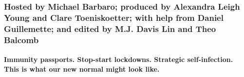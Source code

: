 \hypertarget{hosted-by-michael-barbaro-produced-by-alexandra-leigh-young-and-clare-toeniskoetter-with-help-from-daniel-guillemette-and-edited-by-mj-davis-lin-and-theo-balcomb}{%
\subsubsection{Hosted by Michael Barbaro; produced by Alexandra Leigh
Young and Clare Toeniskoetter; with help from Daniel Guillemette; and
edited by M.J. Davis Lin and Theo
Balcomb}\label{hosted-by-michael-barbaro-produced-by-alexandra-leigh-young-and-clare-toeniskoetter-with-help-from-daniel-guillemette-and-edited-by-mj-davis-lin-and-theo-balcomb}}

\hypertarget{immunity-passports-stop-start-lockdowns-strategic-self-infection-this-is-what-our-new-normal-might-look-like}{%
\paragraph{Immunity passports. Stop-start lockdowns. Strategic
self-infection. This is what our new normal might look
like.}\label{immunity-passports-stop-start-lockdowns-strategic-self-infection-this-is-what-our-new-normal-might-look-like}}

